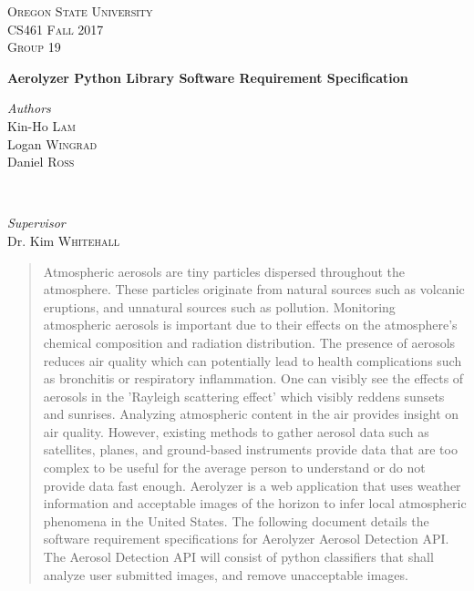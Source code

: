 \documentclass[journal,10pt,draftclsnofoot,onecolumn]{IEEEtran}
\begin{document}
	\begin{titlepage}

	\center

	\textsc{\LARGE Oregon State University}\\[1.5cm]
	\textsc{\Large CS461 Fall 2017 }\\[0.5cm]
	\textsc{\large Group 19}\\[0.5cm] %

	\vfill

	{\huge\bfseries Aerolyzer Python Library Software Requirement Specification}\\[0.4cm]

	\vfill

	\begin{minipage}{0.4\textwidth}
		\begin{flushleft}
			\large
			\textit{Authors}\\
			Kin-Ho \textsc{Lam}\\
			Logan \textsc{Wingrad}\\
			Daniel \textsc{Ross}\\
		\end{flushleft}
	\end{minipage}
	~
	\begin{minipage}{0.4\textwidth}
		\begin{flushright}
			\large
			\textit{Supervisor}\\
			Dr. Kim \textsc{Whitehall}
		\end{flushright}
	\end{minipage}

	\vfill

	\begin{abstract}
		\begin{singlespace}
			Atmospheric aerosols are tiny particles dispersed throughout the atmosphere.
			These particles originate from natural sources such as volcanic eruptions, and unnatural sources such as pollution. 
			Monitoring atmospheric aerosols is important due to their effects on the atmosphere's chemical composition and radiation distribution.
			The presence of aerosols reduces air quality which can potentially lead to health complications such as bronchitis or respiratory inflammation.
			One can visibly see the effects of aerosols in the 'Rayleigh scattering effect' which visibly reddens sunsets and sunrises.
			Analyzing atmospheric content in the air provides insight on air quality. 
			However, existing methods to gather aerosol data such as satellites, planes, and ground-based instruments provide data that are too complex to be useful for the average person to understand or do not provide data fast enough.
			Aerolyzer is a web application that uses weather information and acceptable images of the horizon to infer local atmospheric phenomena in the United States. 
			The following document details the software requirement specifications for Aerolyzer Aerosol Detection API. The Aerosol Detection API will consist of  python classifiers that shall analyze user submitted images, and remove unacceptable images.
		\end{singlespace}
	\end{abstract}


\end{titlepage}
\end{document}
